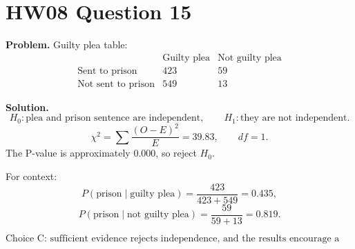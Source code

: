 \documentclass[11pt]{article}
\begin{document}
\section*{HW08 Question 15}

\textbf{Problem.} Guilty plea table:
\[
\begin{array}{c|cc}
 & \text{Guilty plea} & \text{Not guilty plea}\\ \hline
\text{Sent to prison} & 423 & 59\\
\text{Not sent to prison} & 549 & 13
\end{array}
\]

\textbf{Solution.}
\[
H_0:\text{plea and prison sentence are independent},\qquad
H_1:\text{they are not independent}.
\]
\[
\chi^2=\sum\frac{(O-E)^2}{E}=39.83,\qquad df=1.
\]
The P-value is approximately \(0.000\), so reject \(H_0\).

For context:
\[
P(\text{prison}\mid\text{guilty plea})=\frac{423}{423+549}=0.435,
\]
\[
P(\text{prison}\mid\text{not guilty plea})=\frac{59}{59+13}=0.819.
\]

\[
\boxed{\text{Choice C: sufficient evidence rejects independence, and the results encourage a guilty plea.}}
\]
\end{document}
